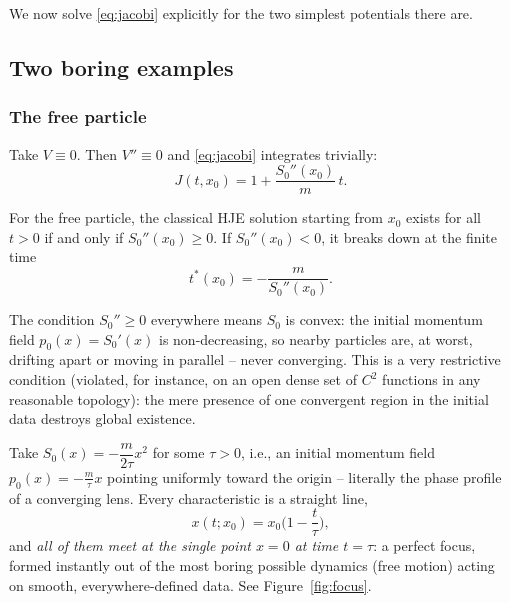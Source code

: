 We now solve \eqref{eq:jacobi} explicitly for the two simplest potentials there are.

\subsection{Two boring examples}
\label{sec:examples}

\subsubsection{The free particle}
\label{sec:free}

Take $V\equiv0$. Then $V''\equiv0$ and \eqref{eq:jacobi} integrates trivially:
\begin{equation}
J(t,x_0) = 1 + \frac{S_0''(x_0)}{m}\,t.
\label{eq:Jfree}
\end{equation}

\begin{proposition}
\label{prop:free}
For the free particle, the classical HJE solution starting from $x_0$ exists
    for all $t>0$ if and only if $S_0''(x_0)\ge 0$. If $S_0''(x_0)<0$, it
    breaks down at the finite time
\[
t^\ast(x_0) = -\frac{m}{S_0''(x_0)}.
\]
\end{proposition}

The condition $S_0''\ge0$ everywhere means $S_0$ is convex: the initial
momentum field $p_0(x)=S_0'(x)$ is non-decreasing, so nearby particles are, at
worst, drifting apart or moving in parallel -- never converging. This is a very
restrictive condition (violated, for instance, on an open dense set of $C^2$
functions in any reasonable topology): the mere presence of one convergent
region in the initial data destroys global existence.

\begin{example}[A lens]
Take $S_0(x) = -\dfrac{m}{2\tau}x^2$ for some $\tau>0$, i.e., an initial
    momentum field $p_0(x)=-\frac{m}{\tau}x$ pointing uniformly toward the
    origin -- literally the phase profile of a converging lens. Every
    characteristic is a straight line,
\[
x(t;x_0) = x_0\Big(1-\frac{t}{\tau}\Big),
\]
and \emph{all of them meet at the single point $x=0$ at time $t=\tau$}: a
    perfect focus, formed instantly out of the most boring possible dynamics
    (free motion) acting on smooth, everywhere-defined data. See
    Figure~\ref{fig:focus}.
\end{example}

